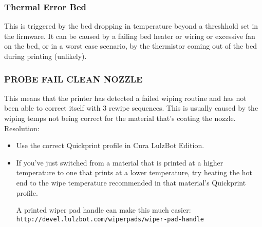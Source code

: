 \subsubsection{Thermal Error Bed}
This is triggered by the bed dropping in temperature beyond a threshhold set in the firmware. It can be caused by a failing bed heater or wiring or excessive fan on the bed, or in a worst case scenario, by the thermistor coming out of the bed during printing (unlikely).

\subsubsection{PROBE FAIL CLEAN NOZZLE}
This means that the printer has detected a failed wiping routine and has not been able to correct itself with 3 rewipe sequences. This is usually caused by the wiping temps not being correct for the material that’s coating the nozzle.
Resolution:
\begin{itemize}
\item Use the correct Quickprint profile in Cura LulzBot Edition.
\item If you’ve just switched from a material that is printed at a higher temperature to one that prints at a lower temperature, try heating the hot end to the wipe temperature recommended in that material’s Quickprint profile. 

A printed wiper pad handle can make this much easier: \texttt{http://devel.lulzbot.com/wiper\textunderscore pads/wiper-pad-handle}
\end{itemize}
